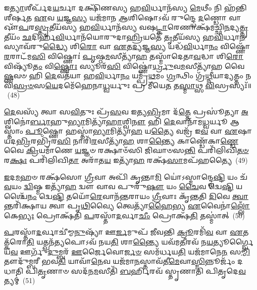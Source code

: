 𑌇\-\ul{𑌤𑍍𑌯𑌾}\-𑌶𑍀𑌰𑍍𑌪᳴𑌦\-\ul{𑌯}\-𑌰𑍍𑌚𑌾 𑌦𑌕𑍍𑌷𑌿᳴𑌣𑌸𑍍𑌯 𑌹\-\ul{𑌵𑌿}\-𑌰𑍍𑌧𑌾𑌨᳴𑌸𑍍𑌯 \ul{𑌮𑍇}\-𑌥𑍀𑌂 𑌨𑌿 𑌹᳴𑌨𑍍𑌤𑌿 𑌶𑍀𑌰𑍍\mbox{}\-\ul{𑌷}\-𑌤 \ul{𑌏}\-𑌵 \ul{𑌯}\-𑌜𑍍𑌞\-\ul{𑌸𑍍𑌯} 𑌯𑌜᳴𑌮𑌾𑌨 \ul{𑌆}\-𑌶𑌿𑌷𑍋\-𑌽𑌵᳴ 𑌰𑍁𑌨𑍍𑌦𑍍𑌧𑍇 \ul{𑌦}\-𑌣𑍍𑌡𑍋 𑌵𑌾 𑌔᳴\-\ul{𑌪}\-𑌰\-\ul{𑌸𑍍𑌤𑍃}\-𑌤𑍀𑌯᳴𑌸𑍍𑌯 𑌹\-\ul{𑌵𑌿}\-𑌰𑍍𑌧𑌾𑌨᳴𑌸𑍍𑌯 𑌵𑌷\-\ul{𑌟𑍍𑌕𑌾}\-𑌰𑍇𑌣𑌾𑌕𑍍𑌷᳴𑌮𑌚𑍍𑌛𑌿\-\ul{𑌨}\-𑌦𑍍𑌯\-\ul{𑌤𑍍𑌤𑍃}\-𑌤𑍀𑌯𑌂᳴ \ul{𑌛}\-𑌦𑌿𑌰𑍍\mbox{}𑌹᳴\-\ul{𑌵𑌿}\-𑌰𑍍𑌧𑌾𑌨᳴𑌯𑍋𑌰𑍁𑌦𑌾\-\ul{𑌹𑍍𑌰𑌿}\-𑌯𑌤𑍇᳴ \ul{𑌤𑍃}\-𑌤𑍀𑌯᳴𑌸𑍍𑌯 𑌹\-\ul{𑌵𑌿}\-𑌰𑍍𑌧𑌾\-\ul{𑌨}\-𑌸𑍍𑌯𑌾𑌵᳴𑌰𑍁\-\ul{𑌦𑍍𑌧𑍍𑌯𑍈} 𑌶𑌿\-\ul{𑌰𑍋} 𑌵𑌾 \ul{𑌏}\-𑌤\-\ul{𑌦𑍍𑌯}\-𑌜𑍍𑌞\-\ul{𑌸𑍍𑌯} 𑌯𑌦𑍍𑌧᳴\-\ul{𑌵𑌿}\-𑌰𑍍𑌧𑌾\-\ul{𑌨𑌂} 𑌵𑌿𑌷𑍍𑌣𑍋᳴ \ul{𑌰}\-𑌰𑌾𑌟᳴𑌮\-\ul{𑌸𑌿} 𑌵𑌿𑌷𑍍𑌣𑍋𑌃॑ \ul{𑌪𑍃}\-𑌷𑍍𑌠\-\ul{𑌮}\-𑌸𑍀𑌤𑍍𑌯𑌾᳴\-\ul{𑌹} 𑌤𑌸𑍍𑌮𑌾᳴𑌦𑍇𑌤𑌾\-\ul{𑌵}\-𑌦𑍍𑌧𑌾 𑌶𑌿\-\ul{𑌰𑍋} 𑌵𑌿𑌷𑍍𑌯𑍂᳴\-\ul{𑌤𑌂} 𑌵𑌿\-\ul{𑌷𑍍𑌣𑍋𑌃} 𑌸𑍍𑌯𑍂𑌰᳴\-\ul{𑌸𑌿} 𑌵𑌿𑌷𑍍𑌣𑍋॑\-\ul{𑌰𑍍𑌧𑍍𑌰𑍁}\-𑌵\-\ul{𑌮}\-𑌸𑍀𑌤𑍍𑌯𑌾᳴𑌹 𑌵𑍈\-\ul{𑌷𑍍𑌣}\-𑌵𑍞 𑌹𑌿 \ul{𑌦𑍇}\-𑌵𑌤᳴𑌯𑌾 𑌹\-\ul{𑌵𑌿}\-𑌰𑍍𑌧𑌾\-\ul{𑌨𑌂} 𑌯𑌮𑍍𑌪𑍍𑌰᳴\-\ul{𑌥}\-𑌮𑌂 \ul{𑌗𑍍𑌰}\-𑌨𑍍𑌥𑌿𑌂 𑌗𑍍𑌰᳴\-\ul{𑌥𑍍𑌨𑍀}\-𑌯𑌾𑌦𑍍𑌯𑌤𑍍𑌤𑌂 𑌨 𑌵𑌿᳴\-\ul{𑌸𑍍𑌰}\-\-\ul{𑍞}\-𑌸\-\ul{𑌯𑍇}\-𑌦𑌮𑍇᳴𑌹𑍇𑌨𑌾\-\ul{𑌧𑍍𑌵}\-𑌰𑍍𑌯𑍁𑌃 𑌪𑍍𑌰 𑌮𑍀᳴𑌯𑍇\-\ul{𑌤} 𑌤\-\ul{𑌸𑍍𑌮𑌾}\-𑌥𑍍𑌸 \ul{𑌵𑌿}\-𑌸𑍍𑌰𑌸𑍍𑌯𑌃᳴॥~(48)

{\anuvakamend[{𑌪𑌤𑍍𑌨𑍀᳴ 𑌹𑌨𑍍𑌯𑍁𑌰𑍍𑌵𑌾 𑌪𑍃\-\ul{𑌥𑌿}\-𑌵𑍍𑌯𑌾 𑌵𑌿𑌷𑍍𑌯𑍂᳴\-\ul{𑌤𑌂} 𑌵𑌿\-\ul{𑌷𑍍𑌣𑍋𑌃} 𑌷𑌡𑍍𑌵𑌿𑍞᳴𑌶𑌤𑌿𑌶𑍍𑌚}]}%

\-\ul{𑌦𑍇}\-𑌵𑌸𑍍𑌯᳴ 𑌤𑍍𑌵𑌾 𑌸\-\ul{𑌵𑌿}\-𑌤𑍁𑌃 𑌪𑍍𑌰᳴\-\ul{𑌸}\-𑌵 𑌇𑌤𑍍𑌯\-\ul{𑌭𑍍𑌰𑌿}\-𑌮𑌾 𑌦᳴\-\ul{𑌤𑍍𑌤𑍇} 𑌪𑍍𑌰𑌸𑍂॑𑌤𑍍𑌯𑌾 \ul{𑌅}\-𑌶𑍍𑌵𑌿𑌨𑍋॑\-\ul{𑌰𑍍𑌬𑌾}\-𑌹𑍁\-\ul{𑌭𑍍𑌯𑌾}\-𑌮𑌿𑌤𑍍𑌯𑌾᳴\-\ul{𑌹𑌾}\-𑌶𑍍𑌵𑌿\-\ul{𑌨𑍗} 𑌹𑌿 \ul{𑌦𑍇}\-𑌵𑌾𑌨𑌾᳴𑌮\-\ul{𑌧𑍍𑌵}\-𑌰𑍍𑌯𑍂 𑌆𑌸𑍍𑌤𑌾𑌂॑ \ul{𑌪𑍂}\-𑌷𑍍𑌣𑍋 𑌹𑌸𑍍𑌤𑌾॑\-\ul{𑌭𑍍𑌯𑌾}\-𑌮𑌿𑌤𑍍𑌯𑌾᳴\-\ul{𑌹} 𑌯\-\ul{𑌤𑍍𑌯𑍈} 𑌵𑌜𑍍𑌰᳴ 𑌇\-\ul{𑌵} 𑌵𑌾 \ul{𑌏}\-𑌷𑌾 𑌯𑌦\-\ul{𑌭𑍍𑌰𑌿}\-𑌰𑌭𑍍𑌰𑌿᳴𑌰\-\ul{𑌸𑌿} 𑌨𑌾𑌰𑌿᳴\-\ul{𑌰}\-𑌸𑍀𑌤𑍍𑌯𑌾᳴\-\ul{𑌹} 𑌶𑌾\-\ul{𑌨𑍍𑌤𑍍𑌯𑍈} 𑌕𑌾𑌣𑍍𑌡𑍇᳴𑌕𑌾\-\ul{𑌣𑍍𑌡𑍇} 𑌵𑍈 \ul{𑌕𑍍𑌰𑌿}\-𑌯𑌮𑌾᳴𑌣𑍇 \ul{𑌯}\-𑌜𑍍𑌞𑍞 𑌰𑌕𑍍𑌷𑌾𑍞᳴𑌸𑌿 𑌜𑌿𑌘𑌾𑍞𑌸\-\ul{𑌨𑍍𑌤𑌿} 𑌪𑌰𑌿᳴𑌲𑌿𑌖𑌿\-\ul{𑌤}\-\-\ul{𑍞} 𑌰\-\ul{𑌕𑍍𑌷𑌃} 𑌪𑌰𑌿᳴𑌲𑌿𑌖𑌿\-\ul{𑌤𑌾} 𑌅𑌰𑌾᳴𑌤\-\ul{𑌯} 𑌇𑌤𑍍𑌯𑌾᳴\-\ul{𑌹} 𑌰𑌕𑍍𑌷᳴\-\ul{𑌸𑌾}\-𑌮𑌪᳴𑌹𑌤𑍍𑌯𑍈~(49)

\-\ul{𑌇}\-𑌦\-\ul{𑌮}\-𑌹𑍞 𑌰𑌕𑍍𑌷᳴𑌸𑍋 \ul{𑌗𑍍𑌰𑍀}\-𑌵𑌾 𑌅𑌪𑌿᳴ 𑌕𑍃𑌨𑍍𑌤𑌾\-\ul{𑌮𑌿} 𑌯𑍋॑\-𑌽𑌸𑍍𑌮𑌾𑌨𑍍𑌦𑍍𑌵𑍇\-\ul{𑌷𑍍𑌟𑌿} 𑌯𑌂 𑌚᳴ \ul{𑌵}\-𑌯𑌂 \ul{𑌦𑍍𑌵𑌿}\-𑌷𑍍𑌮 𑌇𑌤𑍍𑌯𑌾᳴\-\ul{𑌹} 𑌦𑍍𑌵𑍗 𑌵𑌾𑌵 𑌪𑍁𑌰𑍁᳴\-\ul{𑌷𑍗} 𑌯𑌂 \ul{𑌚𑍈}\-𑌵 𑌦𑍍𑌵𑍇\-\ul{𑌷𑍍𑌟𑌿} 𑌯𑌶𑍍𑌚𑍈᳴\-\ul{𑌨𑌂} 𑌦𑍍𑌵𑍇\-\ul{𑌷𑍍𑌟𑌿} 𑌤𑌯𑍋᳴\-\ul{𑌰𑍇}\-𑌵𑌾𑌨᳴𑌨𑍍𑌤𑌰𑌾𑌯𑌂 \ul{𑌗𑍍𑌰𑍀}\-𑌵𑌾𑌃 𑌕𑍃᳴𑌨𑍍𑌤𑌤𑌿 \ul{𑌦𑌿}\-𑌵𑍇 \ul{𑌤𑍍𑌵𑌾}\-𑌨𑍍𑌤𑌰𑌿᳴𑌕𑍍𑌷𑌾𑌯 𑌤𑍍𑌵𑌾 𑌪𑍃\-\ul{𑌥𑌿}\-𑌵𑍍𑌯𑍈 𑌤𑍍𑌵𑍇𑌤𑍍𑌯𑌾᳴\-\ul{𑌹𑍈}\-𑌭𑍍𑌯 \ul{𑌏}\-𑌵𑍈𑌨𑌾॑\-\ul{𑌲𑍍𑌲𑍋𑌁}\-𑌕𑍇\-\ul{𑌭𑍍𑌯𑌃} 𑌪𑍍𑌰𑍋𑌕𑍍𑌷᳴𑌤𑌿 \ul{𑌪}\-𑌰𑌸𑍍𑌤𑌾᳴\-\ul{𑌦}\-𑌰𑍍𑌵𑌾\-\ul{𑌚𑍀𑌂} 𑌪𑍍𑌰𑍋𑌕𑍍𑌷᳴\-\ul{𑌤𑌿} 𑌤𑌸𑍍𑌮𑌾॑𑌤𑍍~(50)

\-\ul{𑌪}\-𑌰𑌸𑍍𑌤𑌾᳴\-\ul{𑌦}\-𑌰𑍍𑌵𑌾𑌚𑍀॑𑌮𑍍𑌮\-\ul{𑌨𑍁}\-𑌷𑍍𑌯𑌾᳴ 𑌊\-\ul{𑌰𑍍𑌜}\-𑌮𑍁𑌪᳴ 𑌜𑍀𑌵𑌨𑍍𑌤𑌿 \ul{𑌕𑍍𑌰𑍂}\-𑌰𑌮𑌿᳴\-\ul{𑌵} 𑌵𑌾 \ul{𑌏}\-𑌤𑌤𑍍𑌕᳴𑌰𑍋\-\ul{𑌤𑌿} 𑌯𑌤𑍍𑌖𑌨᳴\-\ul{𑌤𑍍𑌯}\-𑌪𑍋\-𑌽𑌵᳴ 𑌨𑌯\-\ul{𑌤𑌿} 𑌶𑌾\-\ul{𑌨𑍍𑌤𑍍𑌯𑍈} 𑌯𑌵᳴𑌮\-\ul{𑌤𑍀}\-𑌰𑌵᳴ 𑌨\-\ul{𑌯}\-𑌤𑍍𑌯𑍂𑌰𑍍𑌗𑍍𑌵𑍈 𑌯\-\ul{𑌵} 𑌊𑌰𑍍𑌗𑍁᳴\-\ul{𑌦𑍁}\-𑌮𑍍𑌬𑌰᳴ \ul{𑌊}\-𑌰𑍍𑌜𑍈𑌵𑍋\-\ul{𑌰𑍍𑌜}\-\-\ul{𑍞} 𑌸𑌮᳴𑌰𑍍𑌧𑌯\-\ul{𑌤𑌿} 𑌯𑌜᳴𑌮𑌾𑌨𑍇\-\ul{𑌨} 𑌸\-\ul{𑌮𑍍𑌮𑌿}\-𑌤𑍗𑌦𑍁᳴𑌮𑍍𑌬𑌰𑍀 𑌭𑌵\-\ul{𑌤𑌿} 𑌯𑌾𑌵𑌾᳴\-\ul{𑌨𑍇}\-𑌵 𑌯𑌜᳴𑌮𑌾\-\ul{𑌨}\-𑌸𑍍𑌤𑌾𑌵᳴𑌤𑍀\-\ul{𑌮𑍇}\-𑌵𑌾\-\ul{𑌸𑍍𑌮𑌿}\-𑌨𑍍𑌨𑍂𑌰𑍍𑌜𑌂᳴ 𑌦𑌧𑌾𑌤𑌿 𑌪𑌿\-\ul{𑌤𑍃}\-𑌣𑌾𑍞 𑌸𑌦᳴𑌨\-\ul{𑌮}\-𑌸𑍀𑌤𑌿᳴ \ul{𑌬}\-𑌰𑍍\mbox{}𑌹𑌿𑌰𑌵᳴ 𑌸𑍍𑌤𑍃𑌣𑌾𑌤𑌿 𑌪𑌿𑌤𑍃𑌦𑍇\-\ul{𑌵}\-𑌤𑍍𑌯𑌮𑍍॑~(51)

